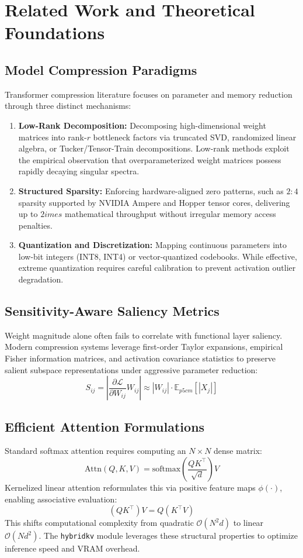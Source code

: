 \section{Related Work and Theoretical Foundations}

\subsection{Model Compression Paradigms}
Transformer compression literature focuses on parameter and memory reduction through three distinct mechanisms:
\begin{enumerate}
\item \textbf{Low-Rank Decomposition:} Decomposing high-dimensional weight matrices into rank-$r$ bottleneck factors via truncated SVD, randomized linear algebra, or Tucker/Tensor-Train decompositions. Low-rank methods exploit the empirical observation that overparameterized weight matrices possess rapidly decaying singular spectra.
\item \textbf{Structured Sparsity:} Enforcing hardware-aligned zero patterns, such as $2:4$ sparsity supported by NVIDIA Ampere and Hopper tensor cores, delivering up to $2	imes$ mathematical throughput without irregular memory access penalties.
\item \textbf{Quantization and Discretization:} Mapping continuous parameters into low-bit integers (INT8, INT4) or vector-quantized codebooks. While effective, extreme quantization requires careful calibration to prevent activation outlier degradation.
\end{enumerate}

\subsection{Sensitivity-Aware Saliency Metrics}
Weight magnitude alone often fails to correlate with functional layer saliency. Modern compression systems leverage first-order Taylor expansions, empirical Fisher information matrices, and activation covariance statistics to preserve salient subspace representations under aggressive parameter reduction:
\[
S_{ij} = \left| \frac{\partial \mathcal{L}}{\partial W_{ij}} W_{ij} \right| \approx |W_{ij}| \cdot \mathbb{E}_{p{5cm}}[|X_j|]
\]

\subsection{Efficient Attention Formulations}
Standard softmax attention requires computing an $N \times N$ dense matrix:
\[
\text{Attn}(Q, K, V) = \text{softmax}\left(\frac{Q K^\top}{\sqrt{d}}\right) V
\]
Kernelized linear attention reformulates this via positive feature maps $\phi(\cdot)$, enabling associative evaluation:
\[
(Q K^\top) V = Q (K^\top V)
\]
This shifts computational complexity from quadratic $\mathcal{O}(N^2 d)$ to linear $\mathcal{O}(N d^2)$. The \texttt{hybridkv} module leverages these structural properties to optimize inference speed and VRAM overhead.
